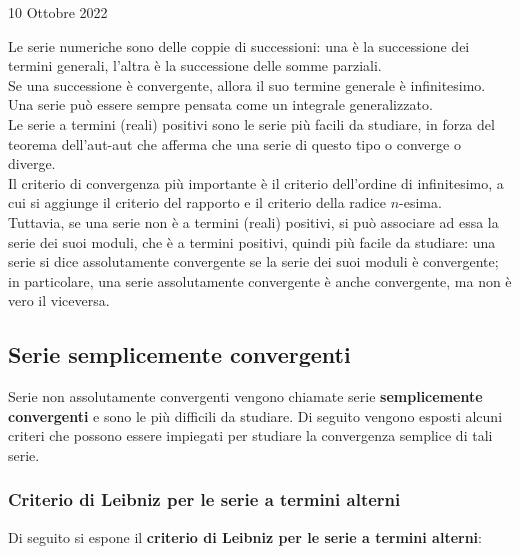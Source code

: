 \documentclass[a4paper]{extarticle}
\begin{document}
\newpage
\begin{center}
    10 Ottobre 2022
\end{center}
Le serie numeriche sono delle coppie di successioni: una è la successione dei termini generali, l'altra è la successione delle somme parziali.\\
Se una successione è convergente, allora il suo termine generale è infinitesimo. Una serie può essere sempre pensata come un integrale generalizzato.\\
Le serie a termini (reali) positivi sono le serie più facili da studiare, in forza del teorema dell'aut-aut che afferma che una serie di questo tipo o converge o diverge.\\
Il criterio di convergenza più importante è il criterio dell'ordine di infinitesimo, a cui si aggiunge il criterio del rapporto e il criterio della radice $n$-esima.\\
Tuttavia, se una serie non è a termini (reali) positivi, si può associare ad essa la serie dei suoi moduli, che è a termini positivi, quindi più facile da studiare: una serie si dice assolutamente convergente se la serie dei suoi moduli è convergente; in particolare, una serie assolutamente convergente è anche convergente, ma non è vero il viceversa.

\vspace{1em}
\subsection{Serie semplicemente convergenti}
Serie non assolutamente convergenti vengono chiamate serie \textbf{semplicemente convergenti} e sono le più difficili da studiare. Di seguito vengono esposti alcuni criteri che possono essere impiegati per studiare la convergenza semplice di tali serie.

\vspace{1em}
\noindent
\subsubsection{Criterio di Leibniz per le serie a termini alterni}
Di seguito si espone il \textbf{criterio di Leibniz per le serie a termini alterni}:
\end{document}
